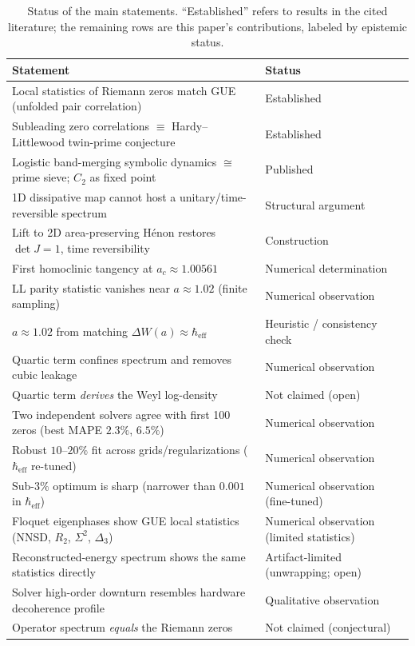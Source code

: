 \documentclass[utf8]{FrontiersinHarvard}
\begin{document}
\begin{table}[h!]
\caption{Status of the main statements. ``Established'' refers to results in the cited literature; the remaining rows are this paper's contributions, labeled by epistemic status.}
\label{tab:claims}
\centering
\small
\begin{tabular}{>{\raggedright\arraybackslash}p{} l}
\toprule
Statement & Status \\
\midrule
Local statistics of Riemann zeros match GUE (unfolded pair correlation) & Established \citep{montgomery1973,odlyzko1987} \\
Subleading zero correlations $\equiv$ Hardy--Littlewood twin-prime conjecture & Established \citep{keating2019} \\
Logistic band-merging symbolic dynamics $\cong$ prime sieve; $C_2$ as fixed point & Published \citep{wang2026} \\
1D dissipative map cannot host a unitary/time-reversible spectrum & Structural argument \\
Lift to 2D area-preserving Hénon restores $\det J=1$, time reversibility & Construction \\
First homoclinic tangency at $a_c \approx 1.00561$ & Numerical determination \\
LL parity statistic vanishes near $a\approx1.02$ (finite sampling) & Numerical observation \\
$a\approx1.02$ from matching $\Delta W(a)\approx\hbar_{\mathrm{eff}}$ & Heuristic / consistency check \\
Quartic term confines spectrum and removes cubic leakage & Numerical observation \\
Quartic term \emph{derives} the Weyl log-density & Not claimed (open) \\
Two independent solvers agree with first 100 zeros (best MAPE $2.3\%$, $6.5\%$) & Numerical observation \\
Robust $10$--$20\%$ fit across grids/regularizations ($\hbar_{\mathrm{eff}}$ re-tuned) & Numerical observation \\
Sub-$3\%$ optimum is sharp (narrower than $0.001$ in $\hbar_{\mathrm{eff}}$) & Numerical observation (fine-tuned) \\
Floquet eigenphases show GUE local statistics (NNSD, $R_2$, $\Sigma^2$, $\Delta_3$) & Numerical observation (limited statistics) \\
Reconstructed-energy spectrum shows the same statistics directly & Artifact-limited (unwrapping; open) \\
Solver high-order downturn resembles hardware decoherence profile & Qualitative observation \\
Operator spectrum \emph{equals} the Riemann zeros & Not claimed (conjectural) \\
\bottomrule
\end{tabular}
\end{table}
\end{document}
